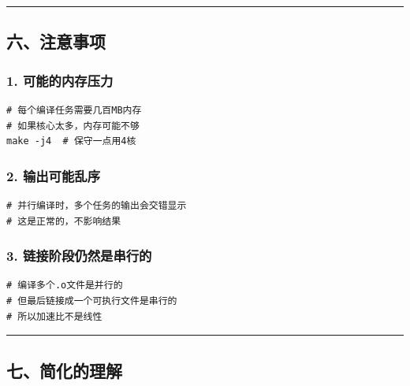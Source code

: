 \documentclass[11pt, a4paper]{article}
\begin{document}
\begin{aibox}
\begin{center}\rule{\textwidth}{0.4pt}\end{center}

\subsection*{六、注意事项}

\subsubsection*{1. 可能的内存压力}
\begin{tcolorbox}[colback=white,colframe=gray!50!white,boxrule=0.5pt,arc=2pt,left=5pt,right=5pt,top=5pt,bottom=5pt]
\begin{verbatim}
# 每个编译任务需要几百MB内存
# 如果核心太多，内存可能不够
make -j4  # 保守一点用4核
\end{verbatim}
\end{tcolorbox}

\subsubsection*{2. 输出可能乱序}
\begin{tcolorbox}[colback=white,colframe=gray!50!white,boxrule=0.5pt,arc=2pt,left=5pt,right=5pt,top=5pt,bottom=5pt]
\begin{verbatim}
# 并行编译时，多个任务的输出会交错显示
# 这是正常的，不影响结果
\end{verbatim}
\end{tcolorbox}

\subsubsection*{3. 链接阶段仍然是串行的}
\begin{tcolorbox}[colback=white,colframe=gray!50!white,boxrule=0.5pt,arc=2pt,left=5pt,right=5pt,top=5pt,bottom=5pt]
\begin{verbatim}
# 编译多个.o文件是并行的
# 但最后链接成一个可执行文件是串行的
# 所以加速比不是线性
\end{verbatim}
\end{tcolorbox}

\begin{center}\rule{\textwidth}{0.4pt}\end{center}

\subsection*{七、简化的理解}


\end{aibox}
\end{document}
